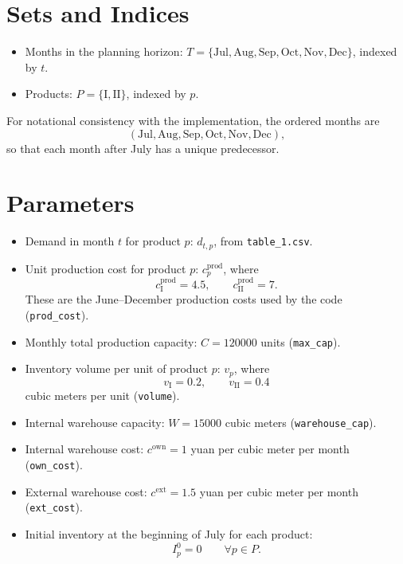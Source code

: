 \section*{Sets and Indices}

\begin{itemize}
    \item Months in the planning horizon: $T=\{\text{Jul},\text{Aug},\text{Sep},\text{Oct},\text{Nov},\text{Dec}\}$, indexed by $t$.
    \item Products: $P=\{\mathrm{I},\mathrm{II}\}$, indexed by $p$.
\end{itemize}

For notational consistency with the implementation, the ordered months are
\[
(\text{Jul},\text{Aug},\text{Sep},\text{Oct},\text{Nov},\text{Dec}),
\]
so that each month after July has a unique predecessor.

\section*{Parameters}

\begin{itemize}
    \item Demand in month $t$ for product $p$: $d_{t,p}$, from \texttt{table\_1.csv}.
    \item Unit production cost for product $p$: $c^{\mathrm{prod}}_p$, where
    \[
    c^{\mathrm{prod}}_{\mathrm{I}} = 4.5,\qquad
    c^{\mathrm{prod}}_{\mathrm{II}} = 7.
    \]
    These are the June--December production costs used by the code (\texttt{prod\_cost}).
    \item Monthly total production capacity: $C = 120000$ units (\texttt{max\_cap}).
    \item Inventory volume per unit of product $p$: $v_p$, where
    \[
    v_{\mathrm{I}} = 0.2,\qquad
    v_{\mathrm{II}} = 0.4
    \]
    cubic meters per unit (\texttt{volume}).
    \item Internal warehouse capacity: $W = 15000$ cubic meters (\texttt{warehouse\_cap}).
    \item Internal warehouse cost: $c^{\mathrm{own}} = 1$ yuan per cubic meter per month (\texttt{own\_cost}).
    \item External warehouse cost: $c^{\mathrm{ext}} = 1.5$ yuan per cubic meter per month (\texttt{ext\_cost}).
    \item Initial inventory at the beginning of July for each product:
    \[
    I^{0}_p = 0 \qquad \forall p\in P.
    \]
\end{itemize}

